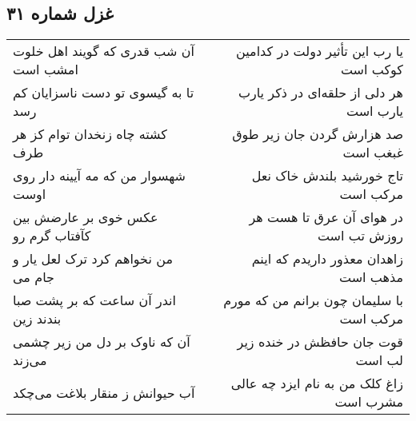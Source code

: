 \begin{center}
\section*{غزل شماره ۳۱}
\label{sec:sh031}
\begin{longtable}{l p{0.5cm} r}
آن شب قدری که گویند اهل خلوت امشب است
&&
یا رب این تأثیر دولت در کدامین کوکب است
\\
تا به گیسوی تو دست ناسزایان کم رسد
&&
هر دلی از حلقه‌ای در ذکر یارب یارب است
\\
کشته چاه زنخدان توام کز هر طرف
&&
صد هزارش گردن جان زیر طوق غبغب است
\\
شهسوار من که مه آیینه دار روی اوست
&&
تاج خورشید بلندش خاک نعل مرکب است
\\
عکس خوی بر عارضش بین کآفتاب گرم رو
&&
در هوای آن عرق تا هست هر روزش تب است
\\
من نخواهم کرد ترک لعل یار و جام می
&&
زاهدان معذور داریدم که اینم مذهب است
\\
اندر آن ساعت که بر پشت صبا بندند زین
&&
با سلیمان چون برانم من که مورم مرکب است
\\
آن که ناوک بر دل من زیر چشمی می‌زند
&&
قوت جان حافظش در خنده زیر لب است
\\
آب حیوانش ز منقار بلاغت می‌چکد
&&
زاغ کلک من به نام ایزد چه عالی مشرب است
\\
\end{longtable}
\end{center}
